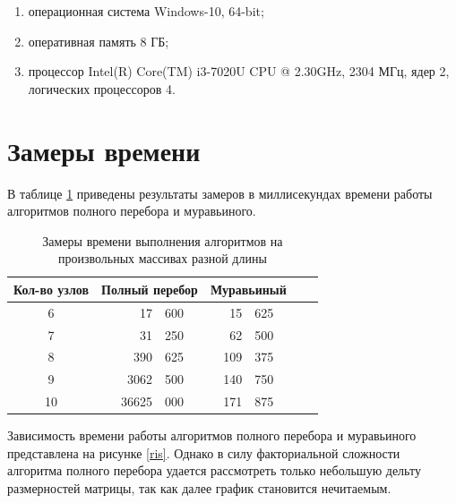 \documentclass[a4paper,14pt, unknownkeysallowed]{extreport}
\begin{document}
\begin{enumerate}
	\item[1)] операционная система Windows-10, 64-bit;
	\item[2)] оперативная память 8 ГБ;
	\item[3)] процессор	Intel(R) Core(TM) i3-7020U CPU @ 2.30GHz, 2304 МГц, ядер 2, логических процессоров 4.
\end{enumerate}

\section{Замеры времени}

В таблице \ref{tab:time} приведены результаты замеров в миллисекундах времени работы алгоритмов полного перебора и муравьиного.

\begin{table}[h!]
    \captionsetup{justification=raggedright,singlelinecheck=off}
    \caption{Замеры времени выполнения алгоритмов на произвольных массивах разной длины}
    \label{tab:time}
	\begin{center}
        \begin{tabular}{| c | r@{.}l | r@{.}l | r@{.}l |}
        \hline
        Кол-во узлов &
        \multicolumn{2}{c|}{Полный перебор} & 
        \multicolumn{2}{c|}{Муравьиный} \\ \hline
				
        6 & 17&600 & 15&625 \\ \hline 
		
        7 & 31&250 & 62&500 \\ \hline 
				
        8 & 390&625 & 109&375 \\ \hline 
				
        9 & 3062&500 & 140&750 \\ \hline

        10 & 36625&000 & 171&875 \\ \hline
       
        \end{tabular}
    \end{center}
\end{table}

Зависимость времени работы алгоритмов полного перебора и муравьиного представлена на рисунке \ref{ris}. 
Однако в силу факториальной сложности алгоритма полного перебора удается рассмотреть только небольшую дельту размерностей матрицы, так как далее график становится нечитаемым.
\end{document}
